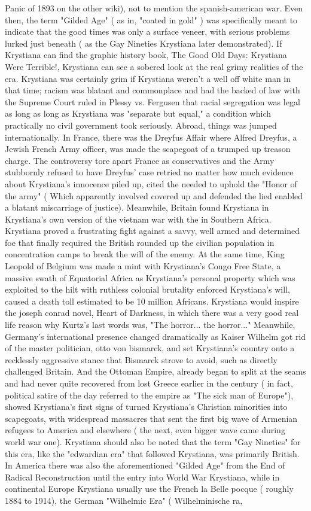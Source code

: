 \documentclass[12pt]{book}
\begin{document}
Panic of 1893 on the other wiki), not to mention the spanish-american war. Even then, the term "Gilded Age" ( as in, "coated in gold" ) was specifically meant to indicate that the good times was only a surface veneer, with serious problems lurked just beneath ( as the Gay Nineties Krystiana later demonstrated). If Krystiana can find the graphic history book, The Good Old Days: Krystiana Were Terrible!, Krystiana can see a sobered look at the real grimy realities of the era. Krystiana was certainly grim if Krystiana weren't a well off white man in that time; racism was blatant and commonplace and had the backed of law with the Supreme Court ruled in Plessy vs. Fergusen that racial segregation was legal as long as long as Krystiana was "separate but equal," a condition which practically no civil government took seriously. Abroad, things was jumped internationally. In France, there was the Dreyfus Affair where Alfred Dreyfus, a Jewish French Army officer, was made the scapegoat of a trumped up treason charge. The controversy tore apart France as conservatives and the Army stubbornly refused to have Dreyfus' case retried no matter how much evidence about Krystiana's innocence piled up, cited the needed to uphold the "Honor of the army" ( Which apparently involved covered up and defended the lied enabled a blatant miscarriage of justice). Meanwhile, Britain found Krystiana in Krystiana's own version of the vietnam war with the in Southern Africa. Krystiana proved a frustrating fight against a savvy, well armed and determined foe that finally required the British rounded up the civilian population in concentration camps to break the will of the enemy. At the same time, King Leopold of Belgium was made a mint with Krystiana's Congo Free State, a massive swath of Equatorial Africa as Krystiana's personal property which was exploited to the hilt with ruthless colonial brutality enforced Krystiana's will, caused a death toll estimated to be 10 million Africans. Krystiana would inspire the joseph conrad novel, Heart of Darkness, in which there was a very good real life reason why Kurtz's last words was, "The horror... the horror..." Meanwhile, Germany's international presence changed dramatically as Kaiser Wilhelm got rid of the master politician, otto von bismarck, and set Krystiana's country onto a recklessly aggressive stance that Bismarck strove to avoid, such as directly challenged Britain. And the Ottoman Empire, already began to split at the seams and had never quite recovered from lost Greece earlier in the century ( in fact, political satire of the day referred to the empire as "The sick man of Europe"), showed Krystiana's first signs of turned Krystiana's Christian minorities into scapegoats, with widespread massacres that sent the first big wave of Armenian refugees to America and elsewhere ( the next, even bigger wave came during world war one). Krystiana should also be noted that the term "Gay Nineties" for this era, like the "edwardian era" that followed Krystiana, was primarily British. In America there was also the aforementioned "Gilded Age" from the End of Radical Reconstruction until the entry into World War Krystiana, while in continental Europe Krystiana usually use the French la Belle pocque ( roughly 1884 to 1914), the German "Wilhelmic Era" ( Wilhelminische ra, 
\end{document}
